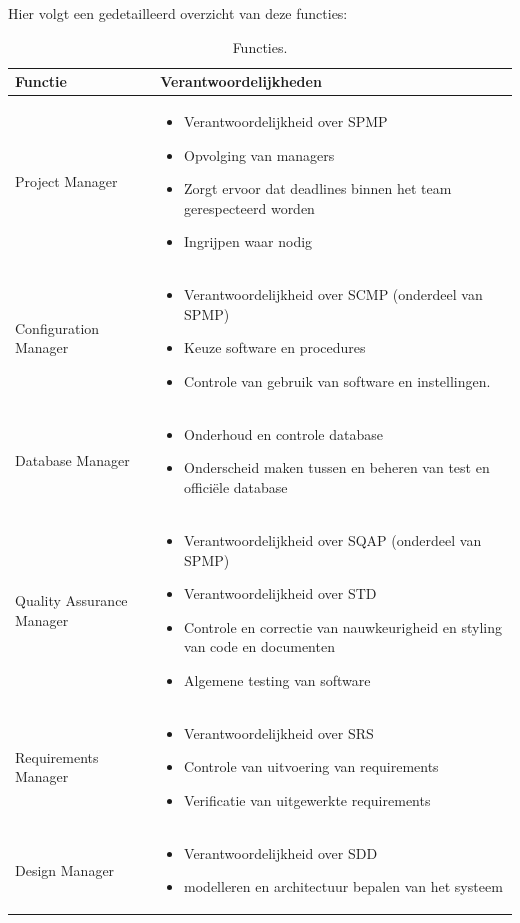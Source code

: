 Hier volgt een gedetailleerd overzicht van deze functies:
\begin{table} [H]
	\centering
	\caption{Functies.}
	\begin{tabular} {l | p{10cm}}
		Functie & Verantwoordelijkheden \\
		\hline
		Project Manager &  
		\begin{itemize}
		\item Verantwoordelijkheid over SPMP
		\item Opvolging van managers
		\item Zorgt ervoor dat deadlines binnen het team gerespecteerd worden
		\item Ingrijpen waar nodig
		\end{itemize}\\
		\hline
		Configuration Manager &
		\begin{itemize}
		\item Verantwoordelijkheid over SCMP (onderdeel van SPMP)
		\item Keuze software en procedures
		\item Controle van gebruik van software en instellingen.
		\end{itemize}\\
		\hline
		Database Manager &
		\begin{itemize}
		\item Onderhoud en controle database
		\item Onderscheid maken tussen en beheren van test en officiële database
		\end{itemize}\\
		\hline
		Quality Assurance Manager &
		\begin{itemize}
		\item Verantwoordelijkheid over SQAP (onderdeel van SPMP)
		\item Verantwoordelijkheid over STD
		\item Controle en correctie van nauwkeurigheid en styling van code en documenten
		\item Algemene testing van software
		\end{itemize}\\
		\hline
		Requirements Manager &
		\begin{itemize}
		\item Verantwoordelijkheid over SRS
		\item Controle van uitvoering van requirements
		\item Verificatie van uitgewerkte requirements
		\end{itemize}\\
		\hline
		Design Manager &
		\begin{itemize}
		\item Verantwoordelijkheid over SDD
		\item modelleren en architectuur bepalen van het systeem
		\end{itemize}
	\end{tabular}
	\label{tab:functies}
\end{table}
